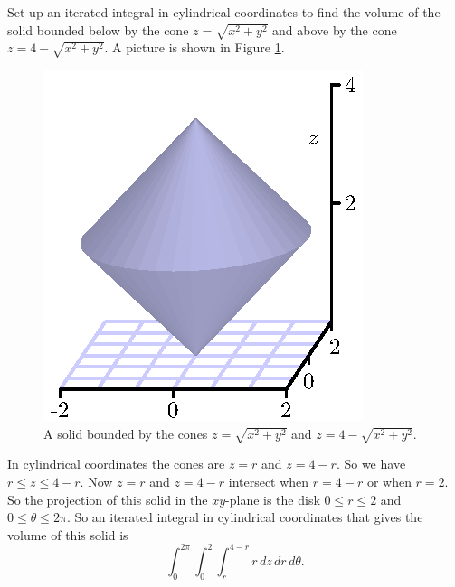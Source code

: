 \begin{activity} \label{A:11.8.5} Set up an iterated integral in cylindrical coordinates to find the volume of the solid bounded below by the cone $z = \sqrt{x^2+y^2}$ and above by the cone $z = 4 - \sqrt{x^2+y^2}$. A picture is shown in Figure \ref{F:11.8.Cylindrical_ex2}.
\begin{figure}[ht]
\begin{center}
  \includegraphics{figures/fig_11_8_two_cones.eps}
\end{center}
\caption{A solid bounded by the cones $z = \sqrt{x^2+y^2}$  and $z = 4 - \sqrt{x^2+y^2}$.}
\label{F:11.8.Cylindrical_ex2}
\end{figure}

\end{activity}
\begin{smallhint}

\end{smallhint}
\begin{bighint}

\end{bighint}
\begin{activitySolution}
In cylindrical coordinates the cones are $z=r$ and $z=4-r$. So we have $r \leq z \leq 4-r$. Now $z=r$ and $z=4-r$ intersect when $r = 4-r$ or when $r=2$. So the projection of this solid in the $xy$-plane is the disk $0 \leq r \leq 2$ and $0 \leq \theta \leq 2\pi$. So an iterated integral in cylindrical coordinates that gives the volume of this solid is
\[\int_0^{2\pi} \int_0^2 \int_{r}^{4-r} r \, dz \, dr \, d\theta.\]
\end{activitySolution}
\aftera
